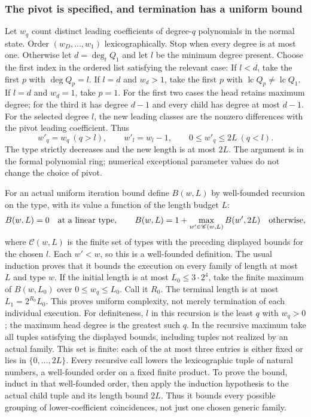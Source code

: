 \documentclass[11pt]{article}
\theoremstyle{definition}
\begin{document}
\subsubsection{The pivot is specified, and termination has a uniform bound}
Let $w_q$ count distinct leading coefficients of degree-$q$ polynomials in the normal state.
Order $(w_D,\ldots,w_1)$ lexicographically.  Stop when every degree is at most one.
Otherwise let $d=\deg_tQ_1$ and let $l$ be the minimum degree present.  Choose the first
index in the ordered list satisfying the relevant case:
If $l<d$, take the first $p$ with $\deg Q_p=l$.
If $l=d$ and $w_d>1$, take the first $p$ with
$\operatorname{lc}Q_p\ne\operatorname{lc}Q_1$.
If $l=d$ and $w_d=1$, take $p=1$.
For the first two cases the head retains maximum degree; for the third it has degree $d-1$
and every child has degree at most $d-1$.  For the selected degree $l$, the new leading
classes are the nonzero differences with the pivot leading coefficient.  Thus
\[
 w'_q=w_q\ (q>l),\qquad w'_l=w_l-1,\qquad 0\leq w'_q\leq2L\ (q<l).
\]
The type strictly decreases and the new length is at most $2L$.
The argument is in the formal polynomial ring; numerical exceptional parameter values do
not change the choice of pivot.

For an actual uniform iteration bound define $B(w,L)$ by well-founded recursion on the type,
with its value a function of the length budget $L$:
\[
 B(w,L)=0\quad\hbox{at a linear type},\qquad
 B(w,L)=1+\max_{w'\in\mathscr C(w,L)}B(w',2L)\quad\hbox{otherwise},
\]
where $\mathscr C(w,L)$ is the finite set of types with the preceding displayed bounds for
the chosen $l$.  Each $w'<w$, so this is a well-founded definition.  The usual induction
proves that it bounds the execution on every family of length at most $L$ and type $w$.
If the initial length is at most $L_0\leq3\cdot2^4$, take the finite maximum of $B(w,L_0)$
over $0\leq w_q\leq L_0$.  Call it $R_0$.  The terminal length is at most $L_1=2^{R_0}L_0$.
This proves uniform complexity, not merely termination of each individual execution.
For definiteness, $l$ in this recursion is the least $q$ with $w_q>0$; the maximum head
degree is the greatest such $q$. In the recursive maximum take all tuples satisfying the
displayed bounds, including tuples not realized by an actual family. This set is finite:
each of the at most three entries is either fixed or lies in $\{0,\ldots,2L\}$.
Every recursive call lowers the lexicographic tuple of natural numbers, a well-founded
order on a fixed finite product. To prove the bound, induct in that well-founded order,
then apply the induction hypothesis to the actual child tuple and its length bound $2L$.
Thus it bounds every possible grouping of lower-coefficient coincidences, not just one
chosen generic family.
\end{document}
